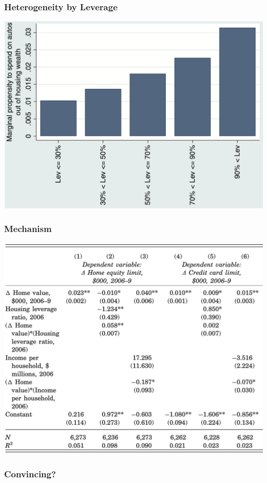 \documentclass[english,xcolor=svgnames]{beamer}
\begin{document}
\begin{frame}
\frametitle[alignment=center]{Heterogeneity by Leverage}
\centering
\includegraphics[scale=0.4]{figures/MRSFIG6.png}
\end{frame}

\begin{frame}
\frametitle[alignment=center]{Mechanism}
\centering
\includegraphics[scale=0.4]{figures/MRSTAB7a.png}
\end{frame}

\begin{frame}
\frametitle[alignment=center]{Convincing?}

\end{frame}
\end{document}
